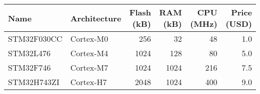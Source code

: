 \begin{tabular}{llrrrr}
\toprule
        Name & Architecture &  Flash (kB) &  RAM (kB) &  CPU (MHz) &  Price (USD) \\
\midrule
 STM32F030CC &    Cortex-M0 &         256 &        32 &         48 &          1.0 \\
   STM32L476 &    Cortex-M4 &        1024 &       128 &         80 &          5.0 \\
   STM32F746 &    Cortex-M7 &        1024 &      1024 &        216 &          7.5 \\
 STM32H743ZI &    Cortex-H7 &        2048 &      1024 &        400 &          9.0 \\
\bottomrule
\end{tabular}
